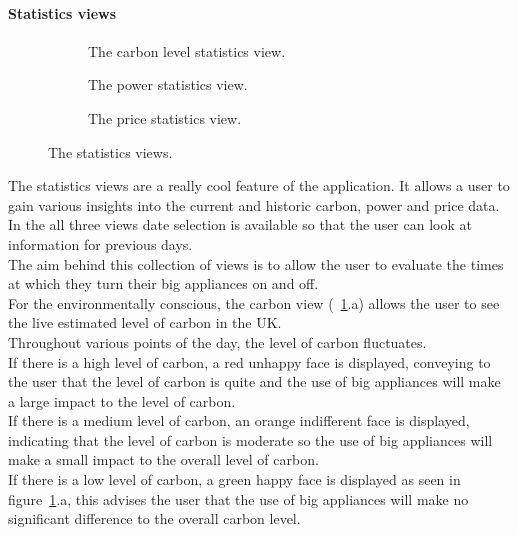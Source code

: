 \documentclass[preprint,12pt,3p]{elsarticle}
\begin{document}
\paragraph{Statistics views}
\begin{figure}[H]
    \centering
    \begin{subfigure}[t]{0.32\columnwidth}
        \centering
        \caption{The carbon level statistics view.}
    \end{subfigure}
    \begin{subfigure}[t]{0.32\columnwidth}
        \centering
        \caption{The power statistics view.}
    \end{subfigure}
    \begin{subfigure}[t]{0.32\columnwidth}
        \centering
        \caption{The price statistics view.}
    \end{subfigure}
    \caption {The statistics views.}
    \label{fig:statisticsviews}
\end{figure}
The statistics views are a really cool feature of the application. It allows a user to gain various insights into the current and historic carbon, power and price data. In the all three views date selection is available so that the user can look at information for previous days.\\
The aim behind this collection of views is to allow the user to evaluate the times at which they turn their big appliances on and off.\\
For the environmentally conscious, the carbon view (~\ref{fig:statisticsviews}.a) allows the user to see the live estimated level of carbon in the UK.\\ 
Throughout various points of the day, the level of carbon fluctuates.\\ 
If there is a high level of carbon, a red unhappy face is displayed, conveying to the user that the level of carbon is quite and the use of big appliances will make a large impact to the level of carbon. \\
If there is a medium level of carbon, an orange indifferent face is displayed, indicating that the level of carbon is moderate so the use of big appliances will make a small impact to the overall level of carbon.\\
If there is a low level of carbon, a green happy face is displayed as seen in figure~\ref{fig:statisticsviews}.a, this advises the user that the use of big appliances will make no significant difference to the overall carbon level.\\
\end{document}
